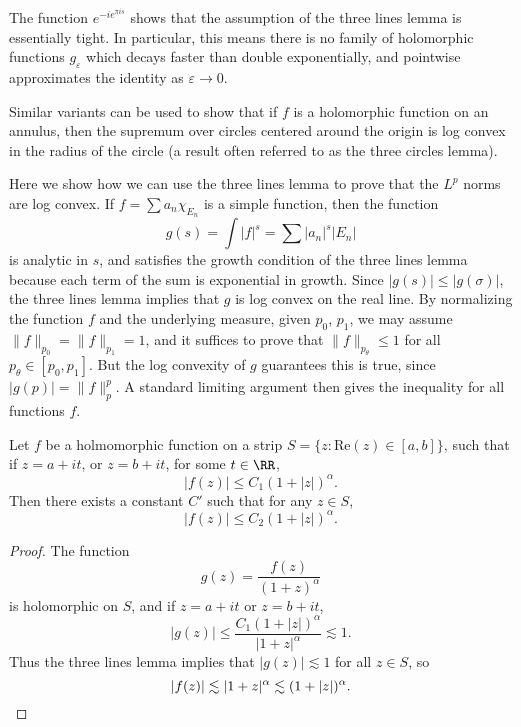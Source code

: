 \begin{remark}
    The function $e^{-ie^{\pi i s}}$ shows that the assumption of the three lines lemma is essentially tight. In particular, this means there is no family of holomorphic functions $g_\varepsilon$ which decays faster than double exponentially, and pointwise approximates the identity as $\varepsilon \to 0$.
\end{remark}

\begin{remark}
    Similar variants can be used to show that if $f$ is a holomorphic function on an annulus, then the supremum over circles centered around the origin is log convex in the radius of the circle (a result often referred to as the three circles lemma).
\end{remark}

\begin{example}
    Here we show how we can use the three lines lemma to prove that the $L^p$ norms are log convex. If $f = \sum a_n \chi_{E_n}$ is a simple function, then the function
    \[ g(s) = \int |f|^s = \sum |a_n|^s |E_n| \]
    is analytic in $s$, and satisfies the growth condition of the three lines lemma because each term of the sum is exponential in growth. Since $|g(s)| \leq |g(\sigma)|$, the three lines lemma implies that $g$ is log convex on the real line. By normalizing the function $f$ and the underlying measure, given $p_0$, $p_1$, we may assume $\| f \|_{p_0} = \| f \|_{p_1} = 1$, and it suffices to prove that $\| f \|_{p_\theta} \leq 1$ for all $p_\theta \in [p_0, p_1]$. But the log convexity of $g$ guarantees this is true, since $|g(p)| = \| f \|_p^p$. A standard limiting argument then gives the inequality for all functions $f$.
\end{example}

\begin{example}
    Let $f$ be a holmomorphic function on a strip $S = \{ z : \text{Re}(z) \in [a,b] \}$, such that if $z = a + it$, or $z = b + it$, for some $t \in \RR$,
    \[ |f(z)| \leq C_1 (1 + |z|)^\alpha. \]
    Then there exists a constant $C'$ such that for any $z \in S$,
    \[ |f(z)| \leq C_2 (1 + |z|)^\alpha. \]
\end{example}
\begin{proof}
    The function
    \[ g(z) = \frac{f(z)}{(1 + z)^\alpha} \]
    is holomorphic on $S$, and if $z = a + it$ or $z = b + it$,
    \[ |g(z)| \leq \frac{C_1 (1 + |z|)^\alpha}{|1 + z|^\alpha} \lesssim 1. \]
    Thus the three lines lemma implies that $|g(z)| \lesssim 1$ for all $z \in S$, so
    \[ |f(z)| \lesssim |1 + z|^\alpha \lesssim (1 + |z|)^\alpha. \qedhere \]
\end{proof}

